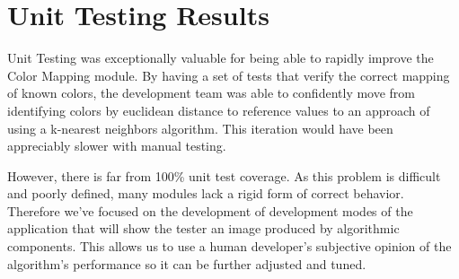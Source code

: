 \documentclass[12pt, titlepage]{article}
\begin{document}
\section{Unit Testing Results}

\par Unit Testing was exceptionally valuable for being able to rapidly improve the Color Mapping module.
By having a set of tests that verify the correct mapping of known colors, the development team was able to confidently move from identifying colors by euclidean distance to reference values to an approach of using a k-nearest neighbors algorithm.
This iteration would have been appreciably slower with manual testing.

\par However, there is far from 100\% unit test coverage.
As this problem is difficult and poorly defined, many modules lack a rigid form of correct behavior.
Therefore we've focused on the development of development modes of the application that will show the tester an image produced by algorithmic components.
This allows us to use a human developer's subjective opinion of the algorithm's performance so it can be further adjusted and tuned.




\end{document}
